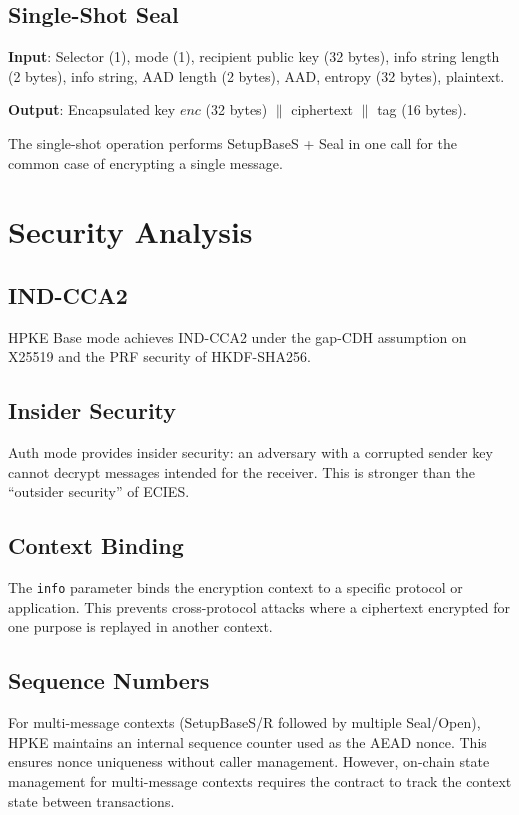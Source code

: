 \documentclass[11pt,a4paper]{article}
\begin{document}
\subsection{Single-Shot Seal}

\textbf{Input}: Selector (1), mode (1), recipient public key (32 bytes),
info string length (2 bytes), info string, AAD length (2 bytes), AAD,
entropy (32 bytes), plaintext.

\textbf{Output}: Encapsulated key $enc$ (32 bytes) $\|$ ciphertext $\|$ tag (16 bytes).

The single-shot operation performs SetupBaseS + Seal in one call for the
common case of encrypting a single message.

\section{Security Analysis}

\subsection{IND-CCA2}

HPKE Base mode achieves IND-CCA2 under the gap-CDH assumption on X25519 and
the PRF security of HKDF-SHA256.

\subsection{Insider Security}

Auth mode provides insider security: an adversary with a corrupted sender key
cannot decrypt messages intended for the receiver. This is stronger than the
``outsider security'' of ECIES.

\subsection{Context Binding}

The \texttt{info} parameter binds the encryption context to a specific protocol
or application. This prevents cross-protocol attacks where a ciphertext encrypted
for one purpose is replayed in another context.

\subsection{Sequence Numbers}

For multi-message contexts (SetupBaseS/R followed by multiple Seal/Open),
HPKE maintains an internal sequence counter used as the AEAD nonce. This
ensures nonce uniqueness without caller management. However, on-chain state
management for multi-message contexts requires the contract to track the
context state between transactions.
\end{document}
